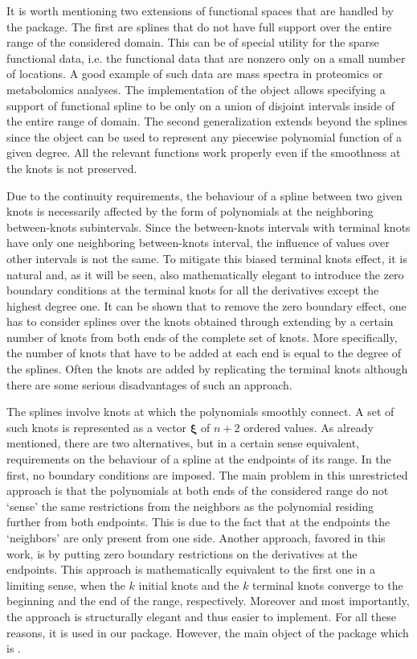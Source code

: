 It is worth mentioning two extensions of functional spaces that are handled by the package. 
The first are splines that do not have full support over the entire range of the considered domain. 
This can be of special utility for the sparse functional data, i.e. the functional data that are nonzero only on a small number of locations.
A good example of such data are mass spectra in proteomics or metabolomics analyses. 
The implementation of the  object allows specifying a support of functional spline to be only on a union of disjoint intervals inside of the entire range of domain.
The second generalization extends beyond the splines since the  object can be used to represent any piecewise polynomial function of a given { degree}. All the relevant functions
work properly even if the smoothness at the knots is not preserved. 

Due to the continuity requirements, the behaviour of a spline between two given knots is necessarily affected by the form of polynomials at the neighboring between-knots subintervals. 
Since the between-knots intervals with terminal knots have only one neighboring between-knots interval, the influence of values over other intervals is not the same.   
To mitigate this biased terminal knots effect, it is natural and, as it will be seen, also mathematically elegant to introduce the zero boundary conditions at the terminal knots for all the derivatives except the highest {  degree} one. 
It can be shown that to remove the zero boundary effect, one has to consider splines over the knots obtained through extending by a certain number of knots from both ends of the complete set of knots. 
More specifically, the number of knots that have to be added at each end is equal to the {  degree}  of the splines. 
Often the knots are added by replicating the terminal knots although there are some serious disadvantages of such an approach.

The splines involve knots at which the polynomials smoothly connect. 
A set of such knots is represented as a vector $\boldsymbol \xi$ of $n+2$ ordered values. 
As already mentioned, there are two alternatives, but in a certain sense equivalent, requirements on the behaviour of a spline at the endpoints of its range.
In the first, no boundary conditions are imposed. The main problem in this unrestricted approach is that the polynomials at both ends of the considered range do not `sense' the same restrictions from the neighbors as the polynomial residing further from both endpoints. This is due to the fact that at the endpoints the `neighbors'  are only present from one side.
Another approach, favored in this work, is by putting zero boundary restrictions on the derivatives at the endpoints.
This approach is mathematically equivalent to the first one in a limiting sense, when the $k$ initial knots and the $k$ terminal knots converge to the beginning and the end of the range, respectively.  Moreover and most importantly, the approach is structurally elegant and thus easier to implement.
For all these reasons, it is used in our package.   However, the main object of the package which is .

